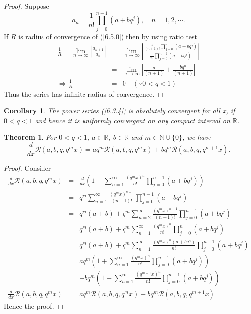 \documentclass[12pt]{article}
\newtheorem{The}{Theorem}[section]
\newtheorem{cor}{Corollary}
\numberwithin{equation}{section}
\begin{document}
\begin{proof}
Suppose
\begin{equation}
a_n =\frac{1}{n!}\prod_{j=0}^{n-1}\left(a+bq^j\right),\quad n=1,2,\cdots.
\end{equation}
If  $R$ is radius of convergence of (\ref{6.5.0}) then by using ratio test  \cite{Apostal}
\begin{eqnarray}
\frac{1}{R}=\lim_{n\to\infty}\left| \frac{a_{n+1}}{a_n}\right| &=&\lim_{n\to\infty}\left| \frac{ \frac{1}{{(n+1)!}}\prod_{j=0}^{n}\left(a+bq^j\right)}{ \frac{1}{n!}\prod_{j=0}^{n-1}\left(a+bq^j\right)}\right| \nonumber\\
&=& \lim_{n\to\infty} \left| \frac{a}{(n+1)} + \frac{bq^n}{(n+1)}\right| \nonumber\\
\Rightarrow\frac{1}{R}&=& 0 \quad (\because 0<q<1)\nonumber
\end{eqnarray}
Thus the series has infinite radius of convergence.
\end{proof}  

\begin{cor}
The power series (\ref{6.3.4}) is  absolutely convergent for all x, if $0<q<1$ and hence it is uniformly convergent on any compact interval on $\mathbb{R}$.
\end{cor}


\begin{The}\label{6.1.3}
For $0<q<1$, $a \in \mathbb{R}$, $b \in \mathbb{R}$  and $m \in \mathbb{N} \cup\{0\} $, we have 
\begin{equation}
 \frac{d}{dx}\mathcal{R}(a,b,q,q^m x)=  a q^m \mathcal{R}(a,b,q,q^m x) + b q^m \mathcal{R}(a,b,q,q^{m+1}x).
\end{equation}
\end{The}

\begin{proof}
 
Consider
\begin{eqnarray*}
\frac{d}{dx}\mathcal{R}(a,b,q,q^m x) &=& \frac{d}{dx} \left( 1 + \sum_{n=1}^\infty\frac{(q^m x)^n}{n!}\prod_{j=0}^{n-1}\left(a + bq^j\right)\right)\\ 
&=& q^m\sum_{n=1}^\infty\frac{(q^m x)^{n-1}}{(n-1)!}\prod_{j=0}^{n-1}\left(a + bq^j\right)\\
&=& q^m (a+b) + q^m\sum_{n=2}^\infty\frac{(q^m x)^{n-1}}{(n-1)!}\prod_{j=0}^{n-1}\left(a + bq^j\right)\\
&=& q^m (a+b) + q^m\sum_{n=1}^\infty\frac{(q^m x)^{n}}{{n}!}\prod_{j=0}^{n}\left(a + bq^j\right)\\
&=& q^m (a+b) + q^m\sum_{n=1}^\infty\frac{(q^m x)^{n}(a+bq^n)}{{n}!}\prod_{j=0}^{n-1}\left(a + bq^j\right)\\
&=& aq^m  \left( 1 + \sum_{n=1}^\infty\frac{(q^m x)^n}{n!}\prod_{j=0}^{n-1}\left(a + bq^j\right)\right)\\
&& + bq^m  \left( 1 + \sum_{n=1}^\infty\frac{(q^{m+1}x)^n}{n!}\prod_{j=0}^{n-1}\left(a + bq^j\right)\right)\\
 \frac{d}{dx}\mathcal{R}(a,b,q,q^m x) &=&  a q^m \mathcal{R}(a,b,q,q^m x) + b q^m \mathcal{R}(a,b,q,q^{m+1}x)
\end{eqnarray*}
Hence the proof.
\end{proof}
\end{document}
